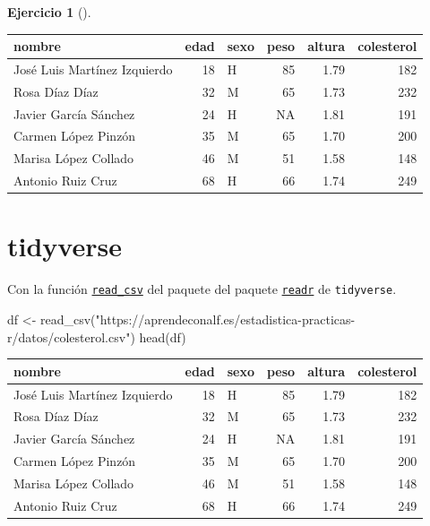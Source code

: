 \documentclass[
  spanish,
  a4paper,
]{scrreport}
\newenvironment{Shaded}{\begin{snugshade}}{\end{snugshade}}
\newcommand{\FunctionTok}[1]{\textcolor[rgb]{0.28,0.35,0.67}{#1}}
\newcommand{\NormalTok}[1]{\textcolor[rgb]{0.00,0.23,0.31}{#1}}
\newcommand{\OtherTok}[1]{\textcolor[rgb]{0.00,0.23,0.31}{#1}}
\newcommand{\StringTok}[1]{\textcolor[rgb]{0.13,0.47,0.30}{#1}}
\theoremstyle{definition}
\newtheorem{exercise}{Ejercicio}[chapter]
\theoremstyle{remark}
\begin{document}
\begin{exercise}[]
\begin{enumerate}
\begin{tcolorbox}
  \begin{longtable}[]{@{}lrlrrr@{}}
  \toprule\noalign{}
  nombre & edad & sexo & peso & altura & colesterol \\
  \midrule\noalign{}
  \endhead
  \bottomrule\noalign{}
  \endlastfoot
  José Luis Martínez Izquierdo & 18 & H & 85 & 1.79 & 182 \\
  Rosa Díaz Díaz & 32 & M & 65 & 1.73 & 232 \\
  Javier García Sánchez & 24 & H & NA & 1.81 & 191 \\
  Carmen López Pinzón & 35 & M & 65 & 1.70 & 200 \\
  Marisa López Collado & 46 & M & 51 & 1.58 & 148 \\
  Antonio Ruiz Cruz & 68 & H & 66 & 1.74 & 249 \\
  \end{longtable}

  \section{tidyverse}

  Con la función
  \href{https://readr.tidyverse.org/reference/read_delim.html}{\texttt{read\_csv}}
  del paquete del paquete
  \href{https://readr.tidyverse.org/index.html}{\texttt{readr}} de
  \texttt{tidyverse}.

\begin{Shaded}
\begin{Highlighting}[]
\NormalTok{df }\OtherTok{\textless{}{-}} \FunctionTok{read\_csv}\NormalTok{(}\StringTok{"https://aprendeconalf.es/estadistica{-}practicas{-}r/datos/colesterol.csv"}\NormalTok{)}
\FunctionTok{head}\NormalTok{(df)}
\end{Highlighting}
\end{Shaded}

  \begin{longtable}[]{@{}lrlrrr@{}}
  \toprule\noalign{}
  nombre & edad & sexo & peso & altura & colesterol \\
  \midrule\noalign{}
  \endhead
  \bottomrule\noalign{}
  \endlastfoot
  José Luis Martínez Izquierdo & 18 & H & 85 & 1.79 & 182 \\
  Rosa Díaz Díaz & 32 & M & 65 & 1.73 & 232 \\
  Javier García Sánchez & 24 & H & NA & 1.81 & 191 \\
  Carmen López Pinzón & 35 & M & 65 & 1.70 & 200 \\
  Marisa López Collado & 46 & M & 51 & 1.58 & 148 \\
  Antonio Ruiz Cruz & 68 & H & 66 & 1.74 & 249 \\
  \end{longtable}


\end{tcolorbox}
\end{enumerate}
\end{exercise}
\end{document}
